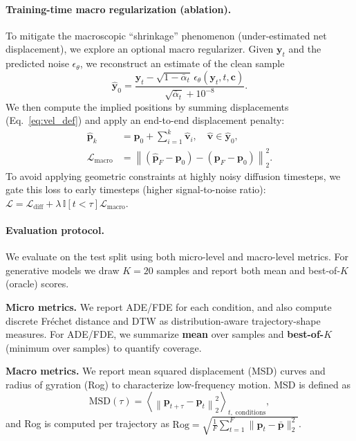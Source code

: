 \paragraph{Training-time macro regularization (ablation).}
To mitigate the macroscopic ``shrinkage'' phenomenon (under-estimated net displacement), we explore an optional macro regularizer. Given $\mathbf{y}_t$ and the predicted noise $\epsilon_\theta$, we reconstruct an estimate of the clean sample
\begin{equation}
  \hat{\mathbf{y}}_0 = \frac{\mathbf{y}_t - \sqrt{1-\bar{\alpha}_t}\,\epsilon_\theta(\mathbf{y}_t,t,\mathbf{c})}{\sqrt{\bar{\alpha}_t} + 10^{-8}}.
  \label{eq:ddpm_x0_recon}
\end{equation}
We then compute the implied positions by summing displacements (Eq.~\ref{eq:vel_def}) and apply an end-to-end displacement penalty:
\begin{align}
  \hat{\mathbf{p}}_k &= \mathbf{p}_0 + \sum_{i=1}^{k} \hat{\mathbf{v}}_i, \quad \hat{\mathbf{v}} \in \hat{\mathbf{y}}_0, \\
  \mathcal{L}_{\mathrm{macro}} &= \left\|(\hat{\mathbf{p}}_F - \mathbf{p}_0) - (\mathbf{p}_F - \mathbf{p}_0)\right\|_2^2.
  \label{eq:macro_loss}
\end{align}
To avoid applying geometric constraints at highly noisy diffusion timesteps, we gate this loss to early timesteps (higher signal-to-noise ratio): $\mathcal{L}=\mathcal{L}_{\mathrm{diff}} + \lambda \,\mathbb{I}[t < \tau]\mathcal{L}_{\mathrm{macro}}$.

\paragraph{Evaluation protocol.}
We evaluate on the test split using both micro-level and macro-level metrics. For generative models we draw $K=20$ samples and report both mean and best-of-$K$ (oracle) scores.

\textbf{Micro metrics.}
We report ADE/FDE for each condition, and also compute discrete Fr\'echet distance and DTW as distribution-aware trajectory-shape measures.
For ADE/FDE, we summarize \textbf{mean} over samples and \textbf{best-of-$K$} (minimum over samples) to quantify coverage.

\textbf{Macro metrics.}
We report mean squared displacement (MSD) curves and radius of gyration (Rog) to characterize low-frequency motion. MSD is defined as
\begin{equation}
  \mathrm{MSD}(\tau) = \left\langle \left\|\mathbf{p}_{t+\tau} - \mathbf{p}_t\right\|_2^2 \right\rangle_{t,\;\mathrm{conditions}},
  \label{eq:msd}
\end{equation}
and Rog is computed per trajectory as $\mathrm{Rog}=\sqrt{\frac{1}{F}\sum_{t=1}^{F}\|\mathbf{p}_t-\bar{\mathbf{p}}\|_2^2}$.

